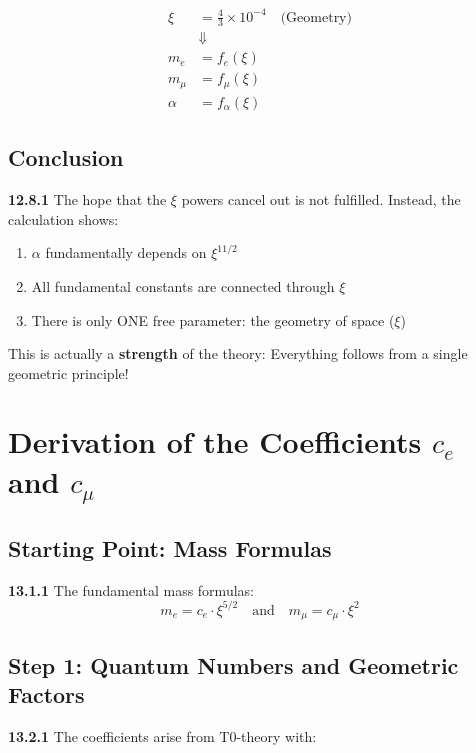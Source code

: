 \documentclass[12pt,a4paper]{article}
\begin{document}
\begin{equation}
	\boxed{
		\begin{aligned}
			\xi &= \frac{4}{3} \times 10^{-4} \quad \text{(Geometry)} \\
			&\Downarrow \\
			m_e &= f_e(\xi) \\
			m_\mu &= f_\mu(\xi) \\
			\alpha &= f_\alpha(\xi)
		\end{aligned}
	}
\end{equation}

\subsection{Conclusion}

\noindent \textbf{12.8.1} The hope that the $\xi$ powers cancel out is not fulfilled. Instead, the calculation shows:

\begin{enumerate}
	\item $\alpha$ fundamentally depends on $\xi^{11/2}$
	\item All fundamental constants are connected through $\xi$
	\item There is only ONE free parameter: the geometry of space ($\xi$)
\end{enumerate}

This is actually a \textbf{strength} of the theory: Everything follows from a single geometric principle!


\section{Derivation of the Coefficients $c_e$ and $c_\mu$}

\subsection{Starting Point: Mass Formulas}

\noindent \textbf{13.1.1} The fundamental mass formulas:
\[
m_e = c_e \cdot \xi^{5/2} \quad \text{and} \quad m_\mu = c_\mu \cdot \xi^2
\]

\subsection{Step 1: Quantum Numbers and Geometric Factors}

\noindent \textbf{13.2.1} The coefficients arise from T0-theory with:
\end{document}
